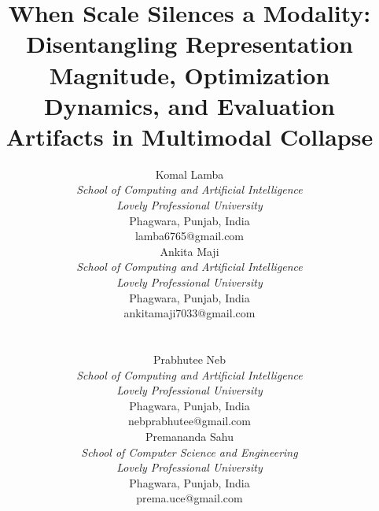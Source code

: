 \documentclass[conference]{IEEEtran}
\begin{document}
\title{When Scale Silences a Modality: Disentangling Representation Magnitude, Optimization Dynamics, and Evaluation Artifacts in Multimodal Collapse}
\author{
\begin{tabular}[t]{@{}c@{}}
  Komal Lamba\\[2pt]
  \textit{School of Computing and Artificial Intelligence}\\
  \textit{Lovely Professional University}\\
  Phagwara, Punjab, India\\
  lamba6765@gmail.com
\end{tabular}
\hspace{1.2cm}
\begin{tabular}[t]{@{}c@{}}
  Ankita Maji\\[2pt]
  \textit{School of Computing and Artificial Intelligence}\\
  \textit{Lovely Professional University}\\
  Phagwara, Punjab, India\\
  ankitamaji7033@gmail.com
\end{tabular}
\\[1.5em]
\begin{tabular}[t]{@{}c@{}}
  Prabhutee Neb\\[2pt]
  \textit{School of Computing and Artificial Intelligence}\\
  \textit{Lovely Professional University}\\
  Phagwara, Punjab, India\\
  nebprabhutee@gmail.com
\end{tabular}
\hspace{1.2cm}
\begin{tabular}[t]{@{}c@{}}
  Premananda Sahu\\[2pt]
  \textit{School of Computer Science and Engineering}\\
  \textit{Lovely Professional University}\\
  Phagwara, Punjab, India\\
  prema.uce@gmail.com
\end{tabular}
}

\maketitle
\end{document}

